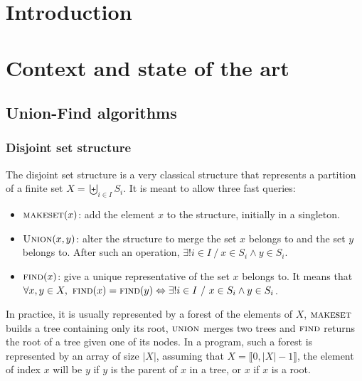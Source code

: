 \documentclass[12px]{article}
\begin{document}
  \section{Introduction }

  \section{Context and state of the art}
    \subsection{Union-Find algorithms}
      \subsubsection{Disjoint set structure}
        The disjoint set structure is a very classical structure that represents a partition of a finite set $X = \biguplus\limits_{i \in I} S_i$. It is meant to allow three fast queries:
        \begin{itemize}
          \item $\Call{makeset}{x}$: add the element $x$ to the structure, initially in a singleton.
          \item $\Call{Union}{x, y}$: alter the structure to merge the set $x$ belongs to and the set $y$ belongs to. After such an operation, $\exists! i \in I~/~x \in S_i \land y \in S_i$.
          \item $\Call{find}{x}$: give a unique representative of the set $x$ belongs to. It means that $\forall x, y \in X,~\Call{find}{x} = \Call{find}{y} \Leftrightarrow \exists! i \in I~/~x \in S_i \land y \in S_i$.
        \end{itemize}

        In practice, it is usually represented by a forest of the elements of $X$, $\textsc{makeset}$ builds a tree containing only its root, $\textsc{union}$ merges two trees and $\textsc{find}$ returns the root of a tree given one of its nodes.
        In a program, such a forest is represented by an array of size $|X|$, assuming that $X = \llbracket 0, |X|-1 \rrbracket$, the element of index $x$ will be $y$ if $y$ is the parent of $x$ in a tree, or $x$ if $x$ is a root.
\end{document}
